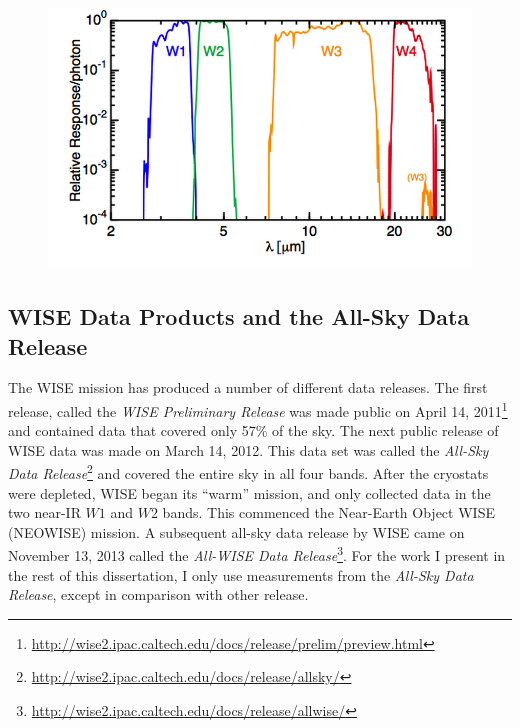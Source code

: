     \begin{figure}
    \centering
    \includegraphics[scale=0.5]{Ch2/wise_response}
    \caption[]{}
    \label{fig:wise_bands}
    \end{figure}
    
    
   
    \subsection{WISE Data Products and the All-Sky Data Release}

    The WISE mission has produced a number of different data releases. The first release, called the \textit{WISE Preliminary Release} was made public on April 14, 2011\footnote{\url{http://wise2.ipac.caltech.edu/docs/release/prelim/preview.html}} and contained data that covered only 57\% of the sky. The next public release of WISE data was made on March 14, 2012. This data set was called the \textit{All-Sky Data Release}\footnote{\url{http://wise2.ipac.caltech.edu/docs/release/allsky/}} and covered the entire sky in all four bands. After the cryostats were depleted, WISE began its ``warm'' mission, and only collected data in the two near-IR $W1$ and $W2$ bands. This commenced the Near-Earth Object WISE (NEOWISE) mission. A subsequent all-sky data release by WISE came on November 13, 2013 called the \textit{All-WISE Data Release}\footnote{\url{http://wise2.ipac.caltech.edu/docs/release/allwise/}}. For the work I present in the rest of this dissertation, I only use measurements from the \textit{All-Sky Data Release}, except in comparison with other release. 
    
